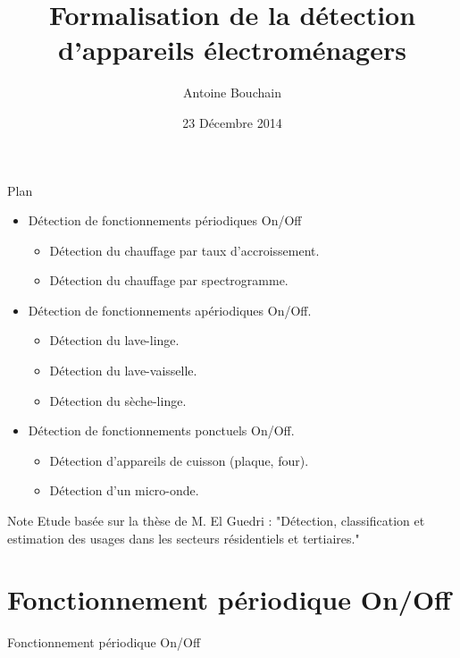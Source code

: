 \documentclass{beamer}
\title[Your Short Title]{Formalisation de la détection d'appareils électroménagers}
\author{Antoine Bouchain}
\date{23 Décembre 2014}
\begin{document}
\begin{frame}
  \titlepage
\end{frame}


\begin{frame}{Plan}

\begin{itemize}
  \item Détection de fonctionnements périodiques On/Off
  \begin{itemize}
  	\item Détection du chauffage par taux d'accroissement.
  	\item Détection du chauffage par spectrogramme.
  \end{itemize}
  \item Détection de fonctionnements apériodiques On/Off.
  \begin{itemize}
  	\item Détection du lave-linge.
  	\item Détection du lave-vaisselle.
  	\item Détection du sèche-linge. 
  \end{itemize}
  \item Détection de fonctionnements ponctuels On/Off.
  \begin{itemize}
  	\item Détection d'appareils de cuisson (plaque, four).
  	\item Détection d'un micro-onde.
  \end{itemize}
\end{itemize}

\begin{block}{Note}
Etude basée sur la thèse de M. El Guedri : "Détection, classification et estimation des usages dans les secteurs résidentiels et tertiaires."
\end{block}

\end{frame}

\section{Fonctionnement périodique On/Off}

\begin{frame}{Fonctionnement périodique On/Off}
\end{frame}
\end{document}

